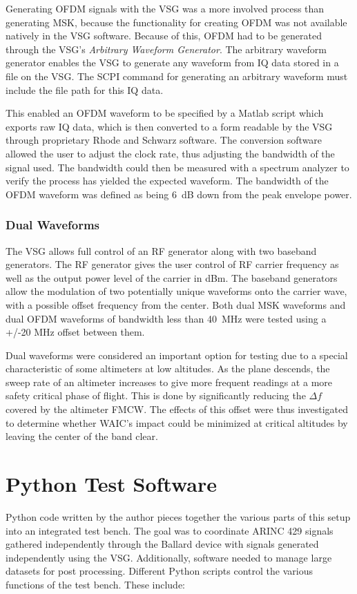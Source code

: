 Generating OFDM signals with the VSG was a more involved process than generating MSK, because the functionality for creating OFDM was not available natively in the VSG software. Because of this, OFDM had to be generated through the VSG's \textit{Arbitrary Waveform Generator}. The arbitrary waveform generator enables the VSG to generate any waveform from IQ data stored in a file on the VSG. The SCPI command for generating an arbitrary waveform must include the file path for this IQ data.  

This enabled an OFDM waveform to be specified by a Matlab script which exports raw IQ data, which is then converted to a form readable by the VSG through proprietary Rhode and Schwarz software. The conversion software allowed the user to adjust the clock rate, thus adjusting the bandwidth of the signal used. The bandwidth could then be measured with a spectrum analyzer to verify the process has yielded the expected waveform. The bandwidth of the OFDM waveform was defined as being 6~dB down from the peak envelope power. 


\subsubsection{Dual Waveforms}\label{subsub:Dual}
The VSG allows full control of an RF generator along with two baseband generators. The RF generator gives the user control of RF carrier frequency as well as the output power level of the carrier in dBm. The baseband generators allow the modulation of two potentially unique waveforms onto the carrier wave, with a possible offset frequency from the center. Both dual MSK waveforms and dual OFDM waveforms of bandwidth less than 40~MHz were tested using a +/-20 MHz offset between them. 

Dual waveforms were considered an important option for testing due to a special characteristic of some altimeters at low altitudes. As the plane descends, the sweep rate of an altimeter increases to give more frequent readings at a more safety critical phase of flight. This is done by significantly reducing the $\Delta f$ covered by the altimeter FMCW. The effects of this offset were thus investigated to determine whether WAIC's impact could be minimized at critical altitudes by leaving the center of the band clear. 


\section{Python Test Software}\label{sec:Python}
Python code written by the author pieces together the various parts of this setup into an integrated test bench. The goal was to coordinate ARINC 429 signals gathered independently through the Ballard device with signals generated independently using the VSG.
Additionally, software needed to manage large datasets for post processing.
Different Python scripts control the various functions of the test bench. These include:

